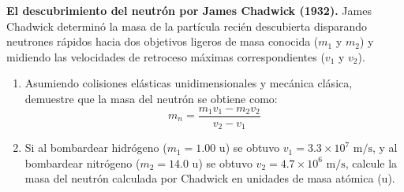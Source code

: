 \item \textbf{El descubrimiento del neutrón por James Chadwick (1932).}
James Chadwick determinó la masa de la partícula recién descubierta disparando neutrones rápidos hacia dos objetivos ligeros de masa conocida ($m_1$ y $m_2$) y midiendo las velocidades de retroceso máximas correspondientes ($v_1$ y $v_2$).
\begin{enumerate}
    \item Asumiendo colisiones elásticas unidimensionales y mecánica clásica, demuestre que la masa del neutrón se obtiene como:
    $$ m_n = \frac{m_1 v_1 - m_2 v_2}{v_2 - v_1} $$
    \item Si al bombardear hidrógeno ($m_1 = 1.00\text{ u}$) se obtuvo $v_1 = 3.3 \times 10^7\text{ m/s}$, y al bombardear nitrógeno ($m_2 = 14.0\text{ u}$) se obtuvo $v_2 = 4.7 \times 10^6\text{ m/s}$, calcule la masa del neutrón calculada por Chadwick en unidades de masa atómica ($\text{u}$).
\end{enumerate}